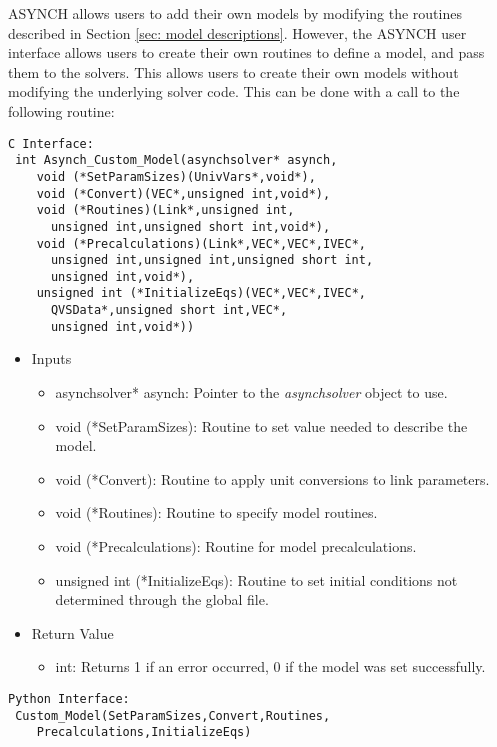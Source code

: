 \documentclass[12pt]{article}
\begin{document}
ASYNCH allows users to add their own models by modifying the routines described in Section \ref{sec: model descriptions}. However, the ASYNCH user interface allows users to create their own routines to define a model, and pass them to the solvers. This allows users to create their own models without modifying the underlying solver code. This can be done with a call to the following routine:
\begin{lstlisting}[style=CStyle]
 C Interface:
 int Asynch_Custom_Model(asynchsolver* asynch,
    void (*SetParamSizes)(UnivVars*,void*),
    void (*Convert)(VEC*,unsigned int,void*),
    void (*Routines)(Link*,unsigned int,
      unsigned int,unsigned short int,void*),
    void (*Precalculations)(Link*,VEC*,VEC*,IVEC*,
      unsigned int,unsigned int,unsigned short int,
      unsigned int,void*),
    unsigned int (*InitializeEqs)(VEC*,VEC*,IVEC*,
      QVSData*,unsigned short int,VEC*,
      unsigned int,void*))
\end{lstlisting}
\begin{itemize}
 \item Inputs
  \begin{itemize}
   \item asynchsolver* asynch: Pointer to the \emph{asynchsolver} object to use.
   \item void (*SetParamSizes): Routine to set value needed to describe the model.
   \item void (*Convert): Routine to apply unit conversions to link parameters.
   \item void (*Routines): Routine to specify model routines.
   \item void (*Precalculations): Routine for model precalculations.
   \item unsigned int (*InitializeEqs): Routine to set initial conditions not determined through the global file.
  \end{itemize}
 \item Return Value
  \begin{itemize}
   \item int: Returns 1 if an error occurred, 0 if the model was set successfully.
  \end{itemize}
\end{itemize}
\begin{lstlisting}[style=PythonStyle]
 Python Interface:
 Custom_Model(SetParamSizes,Convert,Routines,
	Precalculations,InitializeEqs)
\end{lstlisting}
\end{document}
